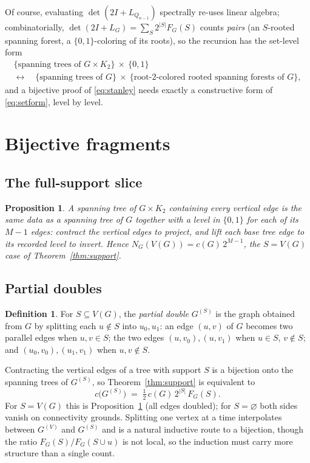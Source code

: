 \documentclass[11pt]{amsart}
\newtheorem{proposition}[theorem]{Proposition}
\theoremstyle{definition}
\newtheorem{definition}[theorem]{Definition}
\begin{document}
Of course, evaluating $\det(2I+L_{Q_{n-1}})$ spectrally re-uses linear
algebra; combinatorially, $\det(2I+L_G) = \sum_S 2^{|S|}F_G(S)$ counts
\emph{pairs} (an $S$-rooted spanning forest, a $\{0,1\}$-coloring of its
roots), so the recursion has the set-level form
\begin{equation}\label{eq:setform}
\begin{gathered}
  \{\text{spanning trees of } G\times K_2\}\ \times\ \{0,1\}\\
  \longleftrightarrow\quad
  \{\text{spanning trees of }G\}\ \times\
  \{\text{root-$2$-colored rooted spanning forests of } G\},
\end{gathered}
\end{equation}
and a bijective proof of \eqref{eq:stanley} needs exactly a constructive
form of \eqref{eq:setform}, level by level.

\section{Bijective fragments}

\subsection{The full-support slice}

\begin{proposition}\label{prop:full}
A spanning tree of $G\times K_2$ containing every vertical edge is the same
data as a spanning tree of $G$ together with a level in $\{0,1\}$ for each
of its $M-1$ edges: contract the vertical edges to project, and lift each
base tree edge to its recorded level to invert. Hence
$N_G(V(G)) = c(G)\,2^{M-1}$, the $S=V(G)$ case of
Theorem~\ref{thm:support}.
\end{proposition}

\subsection{Partial doubles}

\begin{definition}
For $S\subseteq V(G)$, the \emph{partial double} $G^{(S)}$ is the graph
obtained from $G$ by splitting each $u\notin S$ into $u_0,u_1$: an edge
$(u,v)$ of $G$ becomes two parallel edges when $u,v\in S$; the two edges
$(u,v_0),(u,v_1)$ when $u\in S$, $v\notin S$; and $(u_0,v_0),(u_1,v_1)$
when $u,v\notin S$.
\end{definition}

Contracting the vertical edges of a tree with support $S$ is a bijection
onto the spanning trees of $G^{(S)}$, so Theorem~\ref{thm:support} is
equivalent to
\begin{equation}\label{eq:partial}
  c\bigl(G^{(S)}\bigr) \;=\; \tfrac12\,c(G)\,2^{|S|}\,F_G(S).
\end{equation}
For $S=V(G)$ this is Proposition~\ref{prop:full} (all edges doubled); for
$S=\varnothing$ both sides vanish on connectivity grounds. Splitting one
vertex at a time interpolates between $G^{(V)}$ and $G^{(S)}$ and is a
natural inductive route to a bijection, though the ratio
$F_G(S)/F_G(S\cup u)$ is not local, so the induction must carry more
structure than a single count.
\end{document}
